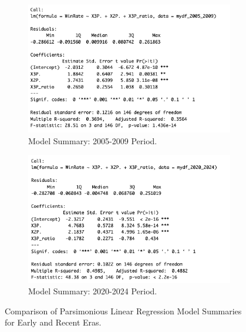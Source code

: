 \documentclass[11pt, a4paper]{article} %
\begin{document}
\begin{figure}[htbp] 
    \centering
    \begin{subfigure}{0.48\textwidth}
        \includegraphics[width=\linewidth]{figure/model0_2005_2009.png} %
        \caption{Model Summary: 2005-2009 Period.}
        \label{fig:model_0509}
    \end{subfigure}\hfill %
    \begin{subfigure}{0.48\textwidth}
        \includegraphics[width=\linewidth]{figure/model0_2020_2024.png} %
        \caption{Model Summary: 2020-2024 Period.}
        \label{fig:model_2024}
    \end{subfigure}
    \caption{Comparison of Parsimonious Linear Regression Model Summaries for Early and Recent Eras.}
    \label{fig:period_models}
\end{figure}
\end{document}
